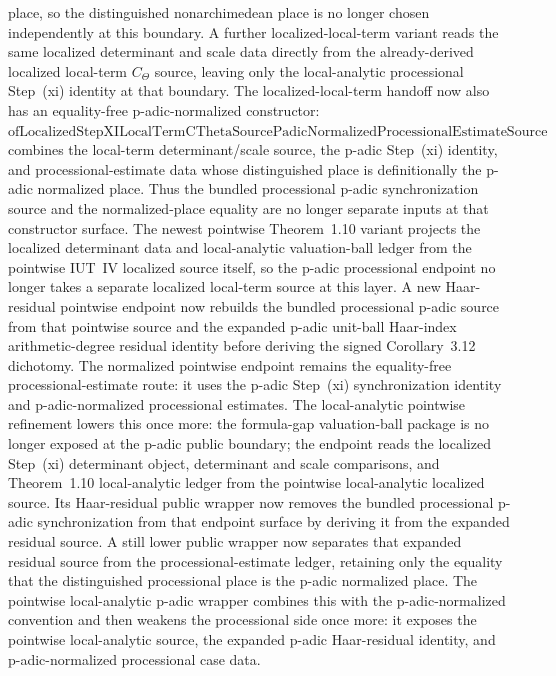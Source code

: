 \documentclass[11pt]{article}
\theoremstyle{plain}
\theoremstyle{definition}
\theoremstyle{remark}
\begin{document}
place, so the distinguished nonarchimedean place is no longer chosen
independently at this boundary.  A further
localized-local-term variant reads the same localized determinant and scale
data directly from the already-derived localized local-term \(C_\Theta\)
source, leaving only the local-analytic processional Step~(xi) identity at
that boundary.  The localized-local-term handoff now also has an
equality-free p-adic-normalized constructor:
\(\mathrm{ofLocalizedStepXILocalTermCThetaSourcePadicNormalizedProcessionalEstimateSource}\)
combines the local-term determinant/scale source, the p-adic Step~(xi)
identity, and processional-estimate data whose distinguished place is
definitionally the p-adic normalized place.  Thus the bundled processional
p-adic synchronization source and the normalized-place equality are no longer
separate inputs at that constructor surface.  The newest pointwise
Theorem~1.10 variant projects the
localized determinant data and local-analytic valuation-ball ledger from the
pointwise IUT~IV localized source itself, so the p-adic processional endpoint
no longer takes a separate localized local-term source at this layer.  A new
Haar-residual pointwise endpoint now rebuilds the bundled processional p-adic
source from that pointwise source and the expanded p-adic unit-ball
Haar-index arithmetic-degree residual identity before deriving the signed
Corollary~3.12 dichotomy.  The normalized pointwise endpoint remains the
equality-free processional-estimate route: it uses the p-adic Step~(xi)
synchronization identity and p-adic-normalized processional estimates.  The
local-analytic pointwise refinement
lowers this once more: the formula-gap valuation-ball package is no longer
exposed at the p-adic public boundary; the endpoint reads the localized
Step~(xi) determinant object, determinant and scale comparisons, and
Theorem~1.10 local-analytic ledger from the pointwise local-analytic
localized source.  Its Haar-residual public wrapper now removes the bundled
processional p-adic synchronization from that endpoint surface by deriving it
from the expanded residual source.  A still lower public wrapper now separates
that expanded residual source from the processional-estimate ledger, retaining
only the equality that the distinguished processional place is the p-adic
normalized place.  The pointwise local-analytic p-adic wrapper combines this
with the p-adic-normalized convention and then weakens the processional side
once more: it exposes the pointwise local-analytic source, the expanded
p-adic Haar-residual identity, and p-adic-normalized processional case data.
\end{document}
